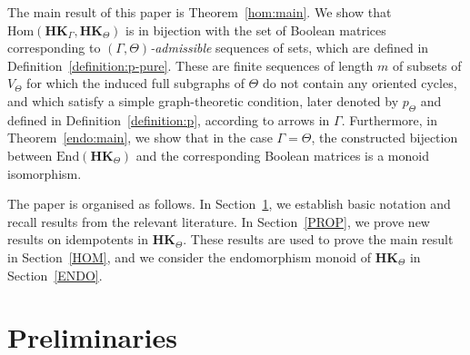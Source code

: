 \documentclass[pdflatex,sn-mathphys-num]{sn-jnl}
\newcommand{\hk}{\mathbf{HK}_{\Theta}}
\newcommand{\hkg}{\mathbf{HK}_{\Gamma}}
\theoremstyle{definition}
\theoremstyle{remark}
\begin{document}
The main result of this paper is Theorem~\ref{hom:main}.
We show that $\mathrm{Hom}(\hkg, \hk)$ is in bijection with the set of Boolean matrices corresponding to $(\Gamma,\Theta)$\emph{-admissible} sequences of sets,
which are defined in Definition~\ref{definition:p-pure}.
These are finite sequences of length $m$ of subsets of $V_{\Theta}$ for which the induced full subgraphs of $\Theta$ do not contain any oriented cycles,
and which satisfy a simple graph-theoretic condition, later denoted by $p_{\Theta}$ and defined in Definition~\ref{definition:p}, according to arrows in $\Gamma$.
Furthermore, in Theorem~\ref{endo:main}, we show that in the case $\Gamma = \Theta$, the constructed bijection between $\mathrm{End}(\hk)$ and the corresponding Boolean matrices is a monoid isomorphism.

The paper is organised as follows.
In Section~\ref{PRELIM}, we establish basic notation and recall results from the relevant literature.
In Section~\ref{PROP}, we prove new results on idempotents in $\hk$.
These results are used to prove the main result in Section~\ref{HOM},
and we consider the endomorphism monoid of $\hk$ in Section~\ref{ENDO}.












































\section{Preliminaries}\label{PRELIM}
\end{document}
